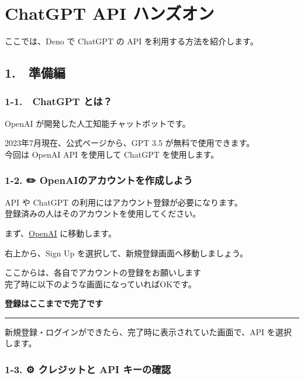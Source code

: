 \section{ChatGPT API
ハンズオン}\label{chatgpt-api-ux30cfux30f3ux30baux30aaux30f3}

ここでは、Deno で ChatGPT の API を利用する方法を紹介します。

\subsection{1. 🔧 準備編}\label{ux6e96ux5099ux7de8}

\subsubsection{1-1. 🧐 ChatGPT とは？}\label{chatgpt-ux3068ux306f}

OpenAI が開発した人工知能チャットボットです。

2023年7月現在、公式ページから、GPT 3.5 が無料で使用できます。\\
今回は OpenAI API を使用して ChatGPT を使用します。

\subsubsection{1-2. ✏️
OpenAIのアカウントを作成しよう}\label{openaiux306eux30a2ux30abux30a6ux30f3ux30c8ux3092ux4f5cux6210ux3057ux3088ux3046}

API や ChatGPT の利用にはアカウント登録が必要になります。\\
登録済みの人はそのアカウントを使用してください。

まず、\href{https://openai.com}{OpenAI} に移動します。

右上から、Sign Up を選択して、新規登録画面へ移動しましょう。

ここからは、各自でアカウントの登録をお願いします🙏\\
完了時に以下のような画面になっていればOKです。

\textbf{登録はここまでで完了です}

\begin{center}\rule{0.5\linewidth}{0.5pt}\end{center}

新規登録・ログインができたら、完了時に表示されていた画面で、API
を選択します。

\subsubsection{1-3. ⚙️ クレジットと API
キーの確認}\label{ux30afux30ecux30b8ux30c3ux30c8ux3068-api-ux30adux30fcux306eux78baux8a8d}

